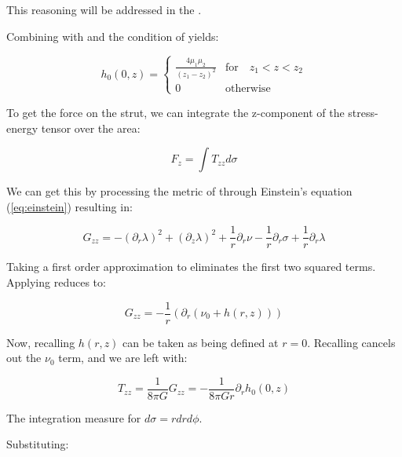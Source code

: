 \documentclass{article}
\begin{document}
This reasoning will be addressed in the .

Combining  with  and the condition of  yields:

\begin{equation}
\label{eq:h_r=0}
h_0 (0,z) = \left\{  \begin{array}{cl}\frac{4\mu_{1}\mu_{2}}{\left(z_{1}-z_{2}\right)^{2}} & \mbox{for}\quad  z_{1}<z<z_{2} \\ 0 & \mbox{otherwise}\end{array}\right. 
\end{equation}

To get the force on the strut, we can integrate the z-component of the stress-energy tensor over the area:

\begin{equation}
	\label{eq:F_z}
	F_{z}=\int T_{zz}d\sigma
\end{equation}

We can get this by processing the metric of  through Einstein's equation (\ref{eq:einstein}) resulting in:

\begin{equation}
\label{eq:G_zz}
G_{zz}=-\left(\partial_{r}\lambda\right)^{2}+\left(\partial_{z}\lambda\right)^{2}+\frac{1}{r}\partial_{r}\nu -\frac{1}{r}\partial_{r}\sigma +\frac{1}{r}\partial_{r}\lambda 
\end{equation}

Taking a first order approximation to  eliminates the first two squared terms. Applying  reduces to:

\begin{equation}
\label{eq:G_zz_reduced}
G_{zz}=-\frac{1}{r}\left(\partial_{r}\left(\nu_0+h(r,z)\right)\right) 
\end{equation}

Now, recalling  $h(r,z)$ can be taken as being defined at $r=0$. Recalling  cancels out the $\nu_0$ term, and we are left with:

\begin{equation}
\label{eq:T_zz}
T_{zz}=\frac{1}{8\pi G}G_{zz}=-\frac{1}{8\pi Gr}\partial_{r}h_0(0,z)
\end{equation}

The integration measure for  $d\sigma=rdrd\phi$.

Substituting:
\end{document}
